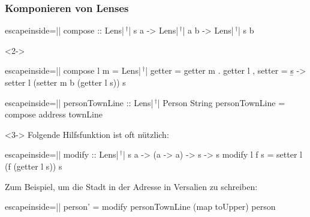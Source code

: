 \documentclass{beamer}
\newcommand{\kreuz}{$\,^\dag$} %
\begin{document}
\begin{frame}[fragile]
  \frametitle{Komponieren von Lenses}
\begin{haskellcode*}{escapeinside=||}
compose :: Lens|\kreuz| s a -> Lens|\kreuz| a b -> Lens|\kreuz| s b
\end{haskellcode*}
  \vspace{-12pt}
  \begin{visibleenv}<2->
\begin{haskellcode*}{escapeinside=||}
compose l m = Lens|\kreuz|
  { getter = getter m . getter l
  , setter = \b s -> setter l (setter m b (getter l s)) s
  }
\end{haskellcode*}
  \end{visibleenv}
\begin{haskellcode*}{escapeinside=||}
personTownLine :: Lens|\kreuz| Person String
personTownLine = compose address townLine
\end{haskellcode*}

\vspace{1em}

  \begin{visibleenv}<3->
    Folgende Hilfsfunktion ist oft nützlich:
\begin{haskellcode*}{escapeinside=||}
modify :: Lens|\kreuz| s a -> (a -> a) -> s -> s
modify l f s = setter l (f (getter l s)) s
\end{haskellcode*}
    Zum Beispiel, um die Stadt in der Adresse in Versalien zu schreiben:
\begin{haskellcode*}{escapeinside=||}
person' = modify personTownLine (map toUpper) person
\end{haskellcode*}
  \end{visibleenv}
\end{frame}
\end{document}
